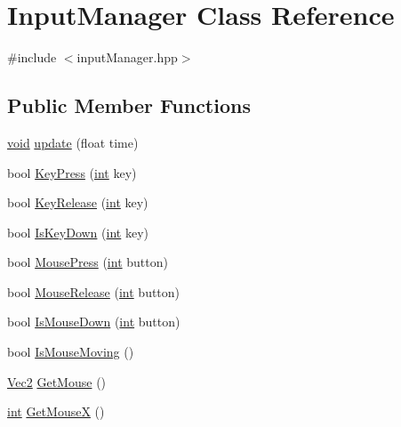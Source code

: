 \hypertarget{class_input_manager}{\section{Input\-Manager Class Reference}
\label{class_input_manager}
}


{\ttfamily \#include $<$input\-Manager.\-hpp$>$}

\subsection*{Public Member Functions}
\begin{DoxyCompactItemize}
\item 
\hyperlink{_s_d_l__opengles2__gl2ext_8h_ae5d8fa23ad07c48bb609509eae494c95}{void} \hyperlink{class_input_manager_ac600b79cd7d00891c01dc7c2bf3cdd4a}{update} (float time)
\item 
bool \hyperlink{class_input_manager_a57c892ec4aefb2f865c9613b51402821}{Key\-Press} (\hyperlink{_s_d_l__thread_8h_a6a64f9be4433e4de6e2f2f548cf3c08e}{int} key)
\item 
bool \hyperlink{class_input_manager_a68008d78dbe65349a63a6cf0baf742e9}{Key\-Release} (\hyperlink{_s_d_l__thread_8h_a6a64f9be4433e4de6e2f2f548cf3c08e}{int} key)
\item 
bool \hyperlink{class_input_manager_a8d4924e8cd6106d529a41be7cd5f0feb}{Is\-Key\-Down} (\hyperlink{_s_d_l__thread_8h_a6a64f9be4433e4de6e2f2f548cf3c08e}{int} key)
\item 
bool \hyperlink{class_input_manager_a3da83876797fc9d370283452f13423d2}{Mouse\-Press} (\hyperlink{_s_d_l__thread_8h_a6a64f9be4433e4de6e2f2f548cf3c08e}{int} button)
\item 
bool \hyperlink{class_input_manager_a2fc15e37edebfa0bcec4d2b9914c363a}{Mouse\-Release} (\hyperlink{_s_d_l__thread_8h_a6a64f9be4433e4de6e2f2f548cf3c08e}{int} button)
\item 
bool \hyperlink{class_input_manager_aa4637f1a4ebdb26e51a91e2d9ec19ea0}{Is\-Mouse\-Down} (\hyperlink{_s_d_l__thread_8h_a6a64f9be4433e4de6e2f2f548cf3c08e}{int} button)
\item 
bool \hyperlink{class_input_manager_a7d3de04b6adc77e8e38c10faf14594a3}{Is\-Mouse\-Moving} ()
\item 
\hyperlink{class_vec2}{Vec2} \hyperlink{class_input_manager_aaa94e3be96fbbd44067473741c9febcf}{Get\-Mouse} ()
\item 
\hyperlink{_s_d_l__thread_8h_a6a64f9be4433e4de6e2f2f548cf3c08e}{int} \hyperlink{class_input_manager_af9bde9886eebfed884ade36fdc85337e}{Get\-Mouse\-X} ()

\end{DoxyCompactItemize}
